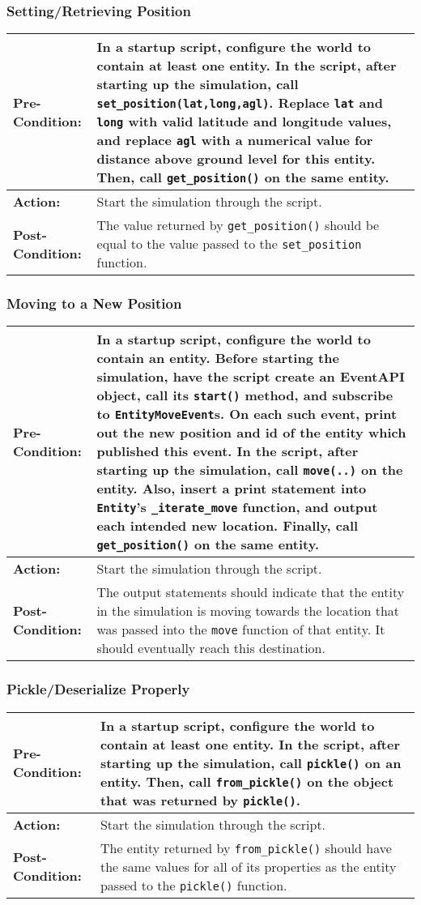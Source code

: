 \documentclass[titlepage]{article}
\newcommand{\testcase}[3]{
    \begin{center}
    \begin{tabular}{| l | p{0.7\textwidth}|}
        \hline
        \rowcolor[gray]{0.8}\textbf{Pre-Condition:} & #1 \\ \hline
        \textbf{Action:} & #2 \\ \hline
        \rowcolor[gray]{0.8}\textbf{Post-Condition:} & #3 \\ \hline
    \end{tabular}
    \end{center}
}
\begin{document}
\subsubsection{Setting/Retrieving Position}
\testcase{In a startup script, configure the world to contain at least one entity. In the script, after starting up the simulation, call \texttt{set\_position(lat,long,agl)}. Replace \texttt{lat} and \texttt{long} with valid latitude and longitude values, and replace \texttt{agl} with a numerical value for distance above ground level for this entity. Then, call \texttt{get\_position()} on the same entity.}{Start the simulation through the script.}{The value returned by \texttt{get\_position()} should be equal to the value passed to the \texttt{set\_position} function.}

\subsubsection{Moving to a New Position}
\testcase{In a startup script, configure the world to contain an entity. Before starting the simulation, have the script create an EventAPI object, call its \texttt{start()} method, and subscribe to \texttt{EntityMoveEvent}s. On each such event, print out the new position and id of the entity which published this event. In the script, after starting up the simulation, call \texttt{move(..)} on the entity. Also, insert a print statement into \texttt{Entity}'s \texttt{\_iterate\_move} function, and output each intended new location. Finally, call \texttt{get\_position()} on the same entity.}{Start the simulation through the script.}{The output statements should indicate that the entity in the simulation is moving towards the location that was passed into the \texttt{move} function of that entity.  It should eventually reach this destination.}

\subsubsection{Pickle/Deserialize Properly}
\testcase{In a startup script, configure the world to contain at least one entity. In the script, after starting up the simulation, call \texttt{pickle()} on an entity. Then, call \texttt{from\_pickle()} on the object that was returned by \texttt{pickle()}.}{Start the simulation through the script.}{The entity returned by \texttt{from\_pickle()} should have the same values for all of its properties as the entity passed to the \texttt{pickle()} function.}
\end{document}
